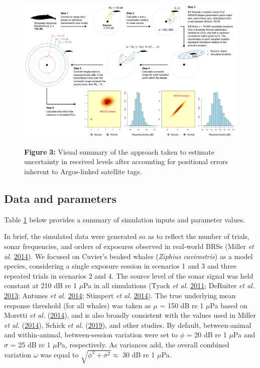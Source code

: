 \documentclass[
]{article}
\begin{document}
\begin{figure}

{\centering \includegraphics[width=1\linewidth]{fig/fig_argos_error} 

}

\textbf{Figure }{\textbf{3:} \hypertarget{fig3}{}Visual summary of the approach taken to estimate uncertainty in received levels after accounting for positional errors inherent to Argos-linked satellite tags.}\label{fig:unnamed-chunk-2}
\end{figure}

\subsection{Data and parameters}

Table \hyperlink{tab1}{1} below provides a summary of simulation inputs and parameter values.

In brief, the simulated data were generated so as to reflect the number of trials, sonar frequencies, and orders of exposures observed in real-world BRSs (Miller \emph{et al.} \protect\hyperlink{ref-Miller2014}{2014}). We focused on Cuvier's beaked whales (\emph{Ziphius cavirostris}) as a model species, considering a single exposure session in scenarios 1 and 3 and three repeated trials in scenarios 2 and 4. The source level of the sonar signal was held constant at 210 dB re 1 \(\mu\)Pa in all simulations (Tyack \emph{et al.} \protect\hyperlink{ref-Tyack2011}{2011}; DeRuiter \emph{et al.} \protect\hyperlink{ref-DeRuiter2013}{2013}; Antunes \emph{et al.} \protect\hyperlink{ref-Antunes2014}{2014}; Stimpert \emph{et al.} \protect\hyperlink{ref-Stimpert2014}{2014}). The true underlying mean response threshold (for all whales) was taken as \(\mu\) = 150 dB re 1 \(\mu\)Pa based on Moretti \emph{et al.} (\protect\hyperlink{ref-Moretti2014}{2014}), and is also broadly consistent with the values used in Miller \emph{et al.} (\protect\hyperlink{ref-Miller2014}{2014}), Schick \emph{et al.} (\protect\hyperlink{ref-Schick2019}{2019}), and other studies. By default, between-animal and within-animal, between-session variation were set to \(\phi\) = 20 dB re 1 \(\mu\)Pa and \(\sigma\) = 25 dB re 1 \(\mu\)Pa, respectively. As variances add, the overall combined variation \(\omega\) was equal to \(\sqrt{{\phi}^2 + {\sigma}^2}\approx\) 30 dB re 1 \(\mu\)Pa.
\end{document}
